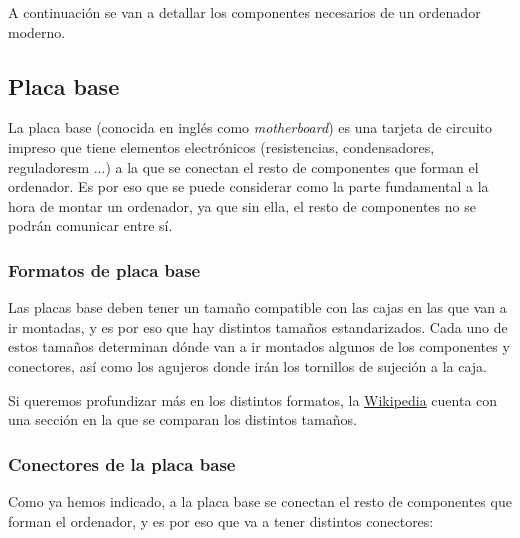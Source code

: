 A continuación se van a detallar los componentes necesarios de un ordenador moderno.

\hypertarget{placa_base}{}
\subsection{Placa base}

La placa base (conocida en inglés como \textit{motherboard}) es una tarjeta de circuito impreso que tiene elementos electrónicos (resistencias, condensadores, reguladoresm ...)  a la que se conectan el resto de componentes que forman el ordenador. Es por eso que se puede considerar como la parte fundamental a la hora de montar un ordenador, ya que sin ella, el resto de componentes no se podrán comunicar entre sí.


\subsubsection{Formatos de placa base}
Las placas base deben tener un tamaño compatible con las cajas en las que van a ir montadas, y es por eso que hay distintos tamaños estandarizados. Cada uno de estos tamaños determinan dónde van a ir montados algunos de los componentes y conectores, así como los agujeros donde irán los tornillos de sujeción a la caja.

Si queremos profundizar más en los distintos formatos, la \href{https://es.wikipedia.org/wiki/Placa_base#Formatos_de_placa_base}{Wikipedia} cuenta con una sección en la que se comparan los distintos tamaños.


\subsubsection{Conectores de la placa base}

Como ya hemos indicado, a la placa base se conectan el resto de componentes que forman el ordenador, y es por eso que va a tener distintos conectores:

